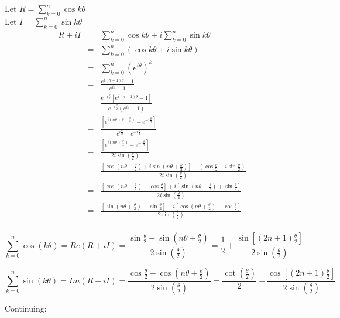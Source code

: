 \documentclass[letterpaper,12pt,fleqn]{article}
\renewcommand{\o}{\theta}
\begin{document}
\begin{theproof}
Let $R=\sum_{k=0}^n\cos k\o$ \\
Let $I=\sum_{k=0}^n\sin k\o$ \\
\begin{eqnarray*}
R+iI &=& \sum_{k=0}^n\cos k\o+i\sum_{k=0}^n\sin k\o \\
    &=& \sum_{k=0}^n(\cos k\o+i\sin k\o) \\
    &=& \sum_{k=0}^n\left(e^{i\o}\right)^k \\
    &=& \frac{e^{i(n+1)\o}-1}{e^{i\o}-1} \\
    &=& \frac{e^{-i\frac{\o}{2}}\left[e^{i(n+1)\o}-1\right]}
        {e^{-i\frac{\o}{2}}\left(e^{i\o}-1\right)} \\
    &=& \frac{\left[e^{i(n\o+\o-\frac{\o}{2})}-e^{-i\frac{\o}{2}}\right]}
        {e^{i\frac{\o}{2}}-e^{-i\frac{\o}{2}}} \\
    &=& \frac{\left[e^{i(n\o+\frac{\o}{2})}-e^{-i\frac{\o}{2}}\right]}
        {2i\sin\left(\frac{\o}{2}\right)} \\
    &=& \frac{\left[\cos\left(n\o+\frac{\o}{2}\right)+
            i\sin\left(n\o+\frac{\o}{2}\right)\right]-
            \left(\cos\frac{\o}{2}-i\sin\frac{\o}{2}\right)}
            {2i\sin\left(\frac{\o}{2}\right)} \\
    &=& \frac{\left[\cos\left(n\o+\frac{\o}{2}\right)-\cos\frac{\o}{2}\right]+
            i\left[\sin\left(n\o+\frac{\o}{2}\right)+\sin\frac{\o}{2}\right]}
            {2i\sin\left(\frac{\o}{2}\right)} \\
    &=& \frac{\left[\sin\left(n\o+\frac{\o}{2}\right)+\sin\frac{\o}{2}\right]-
            i\left[\cos\left(n\o+\frac{\o}{2}\right)-\cos\frac{\o}{2}\right]}
            {2\sin\left(\frac{\o}{2}\right)} \\
\end{eqnarray*}

\[\sum_{k=0}^n\cos(k\o)=Re(R+iI)=
    \frac{\sin\frac{\o}{2}+\sin\left(n\o+\frac{\o}{2}\right)}
    {2\sin\left(\frac{\o}{2}\right)}=
    \frac{1}{2}+\frac{\sin\left[(2n+1)\frac{\o}{2}\right]}
    {2\sin\left(\frac{\o}{2}\right)}\]

\[\sum_{k=0}^n\sin(k\o)=Im(R+iI)=
    \frac{\cos\frac{\o}{2}-\cos\left(n\o+\frac{\o}{2}\right)}
    {2\sin\left(\frac{\o}{2}\right)}=
    \frac{\cot\left(\frac{\o}{2}\right)}{2}-
    \frac{\cos\left[(2n+1)\frac{\o}{2}\right]}
    {2\sin\left(\frac{\o}{2}\right)}\]

Continuing:


\end{theproof}
\end{document}
